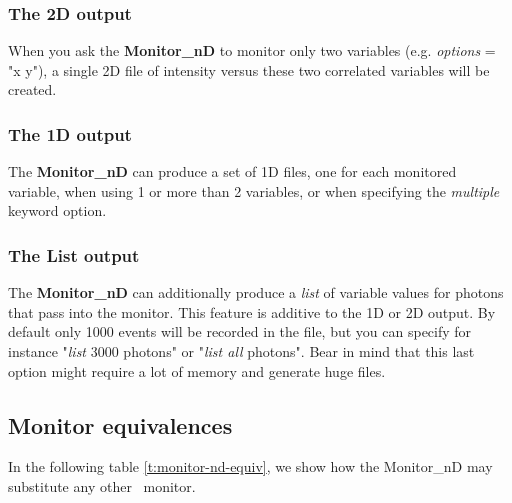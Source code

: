 \subsubsection{The 2D output}

When you ask the \textbf{Monitor\_nD} to monitor only two variables (e.g.
\textit{options} = "x y"), a single 2D file of intensity versus these two
correlated variables will be created.

\subsubsection{The 1D output}

The \textbf{Monitor\_nD} can produce a set of 1D files, one for each
monitored variable, when using 1 or more than 2 variables, or when
specifying the \textit{multiple} keyword option.

\subsubsection{The List output}

The \textbf{Monitor\_nD} can additionally produce a \textit{list} of variable
values for photons that pass into the monitor. This feature is additive
to the 1D or 2D output. By default only 1000 events will be recorded in
the file, but you can specify for instance "\textit{list} 3000 photons" or
"\textit{list all} photons". Bear in mind that this last option might require a lot of
memory and generate huge files.

\subsection{Monitor equivalences}

In the following table \ref{t:monitor-nd-equiv}, we show how the Monitor\_nD may substitute any other \MCX\ monitor.

